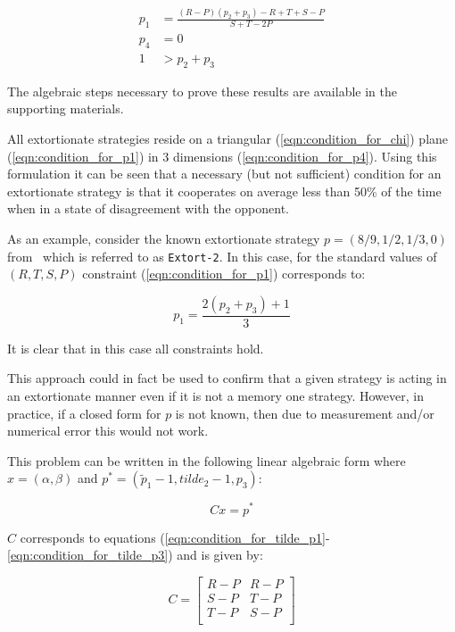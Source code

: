 \documentclass[a4paper]{article}
\begin{document}
\begin{align}
    p_1 & = \frac{(R-P)(p_2 + p_3) - R + T + S - P}{S + T - 2P}
     \label{eqn:condition_for_p1}\\
    p_4 & = 0 \label{eqn:condition_for_p4}\\
    1 & > p_2 + p_3\label{eqn:condition_for_chi}
\end{align}

The algebraic steps necessary to prove these results are available in the
supporting materials.

All extortionate strategies reside on a triangular (\ref{eqn:condition_for_chi})
plane (\ref{eqn:condition_for_p1}) in 3 dimensions (\ref{eqn:condition_for_p4}).
Using this formulation it can be seen that a necessary (but not sufficient)
condition for an extortionate strategy is that it cooperates on average less
than 50\% of the time when in a state of disagreement with the opponent.

As an example, consider the known extortionate strategy \(p=(8 / 9, 1 / 2, 1 /
3, 0)\) from~\cite{Stewart2012} which is referred to as \texttt{Extort-2}. In
this case, for the standard values of \((R, T, S, P)\) constraint
(\ref{eqn:condition_for_p1}) corresponds to:

\begin{equation}
    p_1 = \frac{2(p_2 + p_3) + 1}{3}
\end{equation}

It is clear that in this case all constraints hold.

This approach could in fact be used to confirm that a given strategy is acting
in an extortionate manner even if it is not a memory one strategy. However, in
practice, if a closed form for \(p\) is not known, then due to measurement
and/or numerical error this would not work.

This problem can be written in the following linear algebraic form where
\(x=(\alpha, \beta)\)
and \(p^*=(\tilde p_1 - 1, tilde_2 - 1, p_3)\):

\begin{equation}\label{eqn:linear_algebraic_equation_for_p}
    Cx= p^*
\end{equation}

\(C\) corresponds to equations
(\ref{eqn:condition_for_tilde_p1}-\ref{eqn:condition_for_tilde_p3}) and is
given by:

\begin{equation}\label{eqn:definition_of_C}
    C =
    \begin{bmatrix}
        R - P & R- P \\
        S - P & T- P \\
        T - P & S- P \\
    \end{bmatrix}
\end{equation}
\end{document}
